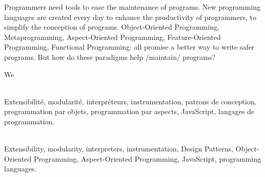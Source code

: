 \begin{titlepage}
\begin{addmargin}[-1cm]{-4cm}
\begin{minipage}[t]{9cm}
Programmers need tools to ease the maintenance of programs.  New programming
languages are created every day to enhance the productivity of programmers, to
simplify the conception of programs.  Object-Oriented Programming,
Metaprogramming, Aspect-Oriented Programming, Feature-Oriented Programming,
Functional Programming: all promise a better way to write safer programs.  But
how do these paradigms help /maintain/ programs?

We
\end{minipage}

\vfill
\noindent
\begin{minipage}[t]{9cm}
\\
Extensibilité, modularité, interpréteurs, instrumentation, patrons de
conception, programmation par objets, programmation par aspects, JavaScript,
langages de programmation.
\end{minipage}%
\hspace{1cm}
\begin{minipage}[t]{9cm}
\\
Extensibility, modularity, interpreters, instrumentation, Design Patterns,
Object-Oriented Programming, Aspect-Oriented Programming, JavaScript,
programming languages.
\end{minipage}
\end{addmargin}
\end{titlepage}


